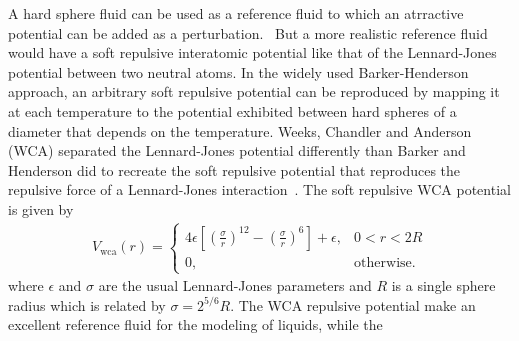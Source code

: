\documentclass[letterpaper,twocolumn,amsmath,amssymb,prb]{revtex4-1}
\begin{document}
A hard sphere fluid can be used as a reference fluid %
to which an atrractive potential can be added as a perturbation.~\cite{zwanzigperturbation}
But a more realistic reference fluid would have a soft repulsive interatomic 
potential like that of the Lennard-Jones potential between two neutral atoms.
In the widely used Barker-Henderson approach, 
an arbitrary soft repulsive potential can be reproduced  
by mapping it at each temperature to the potential exhibited between hard spheres
of a diameter that depends on the temperature\cite{barker1967perturbation}. 
Weeks, Chandler and Anderson (WCA) 
separated the Lennard-Jones potential differently than Barker and Henderson did
to recreate the soft repulsive potential that reproduces 
the repulsive force of a Lennard-Jones interaction~\cite{weeks1971splitpotential}. 
The soft repulsive WCA potential
is given by 
\newcommand\erf{\mathrm{erf}}
\newcommand\Vwca{V_{\mathrm{wca}}}
\newcommand\Verf{V_{\erf}}
\begin{align}
  \Vwca(r) =
  \begin{cases}
    4\epsilon \left[ \left(\frac{\sigma}{r}\right)^{12} -
    \left(\frac{\sigma}{r}\right)^{6} \right] + \epsilon, & 0 < r < 2R \\
    0, & \textrm{otherwise}.
  \end{cases}
\label{eq:Vwca}
\end{align}
where $\epsilon$ and $\sigma$ are the usual Lennard-Jones parameters
and $R$ is a single sphere radius which is related by $\sigma =
2^{5/6} R$.
%
The WCA repulsive potential make an excellent reference fluid for 
the modeling of liquids, while the
\end{document}

